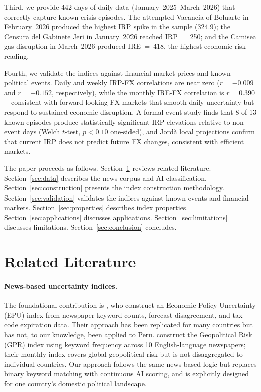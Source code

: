 \documentclass[12pt,a4paper]{article}
\begin{document}
Third, we provide 442 days of daily data (January~2025--March~2026) that
correctly capture known crisis episodes.  The attempted Vacancia of Boluarte
in February~2026 produced the highest IRP spike in the sample (324.9); the
Censura del Gabinete Jeri in January~2026 reached IRP~=~250; and the
Camisea gas disruption in March~2026 produced IRE~=~418, the highest
economic risk reading.

Fourth, we validate the indices against financial market prices and known
political events.  Daily and weekly IRP-FX correlations are near zero
($r = -0.009$ and $r = -0.152$, respectively), while the monthly
IRE-FX correlation is $r = 0.390$---consistent with forward-looking FX
markets that smooth daily uncertainty but respond to sustained economic
disruption.  A formal event study finds that 8 of 13 known episodes produce
statistically significant IRP elevations relative to non-event days (Welch
$t$-test, $p < 0.10$ one-sided), and Jord\`a local projections confirm that
current IRP does not predict future FX changes, consistent with efficient
markets.

The paper proceeds as follows. Section~\ref{sec:lit} reviews related
literature. Section~\ref{sec:data} describes the news corpus and AI
classification. Section~\ref{sec:construction} presents the index
construction methodology. Section~\ref{sec:validation} validates the
indices against known events and financial markets.
Section~\ref{sec:properties} describes index properties.
Section~\ref{sec:applications} discusses applications.
Section~\ref{sec:limitations} discusses limitations.
Section~\ref{sec:conclusion} concludes.

\section{Related Literature}
\label{sec:lit}

\paragraph{News-based uncertainty indices.}
The foundational contribution is \cite{baker2016}, who construct an
Economic Policy Uncertainty (EPU) index from newspaper keyword counts,
forecast disagreement, and tax code expiration data. Their approach has been
replicated for many countries but has not, to our knowledge, been applied to
Peru. \cite{caldara2022} construct the Geopolitical Risk (GPR) index using
keyword frequency across 10 English-language newspapers; their monthly
index covers global geopolitical risk but is not disaggregated to individual
countries. Our approach follows the same news-based logic but replaces
binary keyword matching with continuous AI scoring, and is explicitly
designed for one country's domestic political landscape.
\end{document}

